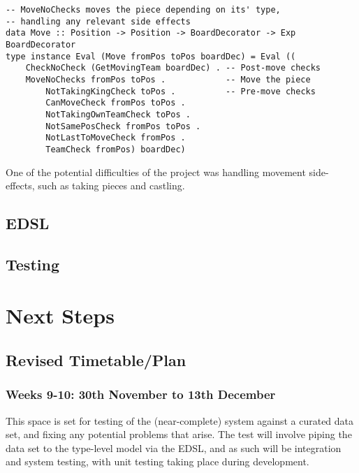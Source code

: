 \documentclass[12pt, a4paper]{scrartcl}
\begin{document}
\begin{lstlisting}
-- MoveNoChecks moves the piece depending on its' type,
-- handling any relevant side effects
data Move :: Position -> Position -> BoardDecorator -> Exp BoardDecorator
type instance Eval (Move fromPos toPos boardDec) = Eval ((
    CheckNoCheck (GetMovingTeam boardDec) . -- Post-move checks
    MoveNoChecks fromPos toPos .            -- Move the piece
        NotTakingKingCheck toPos .          -- Pre-move checks
        CanMoveCheck fromPos toPos .
        NotTakingOwnTeamCheck toPos .
        NotSamePosCheck fromPos toPos .
        NotLastToMoveCheck fromPos .
        TeamCheck fromPos) boardDec)
\end{lstlisting}

One of the potential difficulties of the project was handling movement side-effects, such as taking pieces and castling. 


\subsection{EDSL}

\subsection{Testing}


\section{Next Steps}


\subsection{Revised Timetable/Plan}

\subsubsection{Weeks 9-10: 30th November to 13th December}

This space is set for testing of the (near-complete) system against a curated data set, and fixing any potential problems that arise. The test will involve piping the data set to the type-level model via the EDSL, and as such will be integration and system testing, with unit testing taking place during development.
\end{document}
